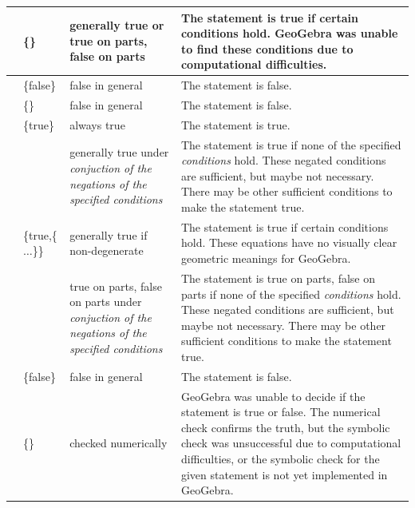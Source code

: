 \documentclass{article}
\begin{document}
\begin{tabular}{|>{\raggedright}m{}|>{\centering}m{}|>{\centering}m{}|>{\centering}m{}|}
\cline{2-4} 
 & {\footnotesize{}\{\}} & {\footnotesize{}generally true or true on parts, false on parts} & {\footnotesize{}The statement is true if certain conditions hold.
GeoGebra was unable to find these conditions due to computational
difficulties.}\tabularnewline
\hline 
\multirow{2}{0.15\textwidth}{\centerline{\footnotesize{}false}} & {\footnotesize{}\{false\}} & {\footnotesize{}false in general} & {\footnotesize{}The statement is false.}\tabularnewline
\cline{2-4} 
 & {\footnotesize{}\{\}} & {\footnotesize{}false in general} & {\footnotesize{}The statement is false.}\tabularnewline
\hline 
\multirow{5}{0.15\textwidth}{\centerline{\footnotesize{}undefined}} & {\footnotesize{}\{true\}} & {\footnotesize{}always true} & {\footnotesize{}The statement is true.}\tabularnewline
\cline{2-4} 
 & \multicolumn{1}{>{\centering}m{0.2\columnwidth}|}{{\footnotesize{}\{true,\{}\emph{\footnotesize{}conditions}{\footnotesize{}\}\}}} & {\footnotesize{}generally true under }\emph{\footnotesize{}conjuction of the negations of the specified
conditions} & {\footnotesize{}The statement is true if none of the specified }\emph{\footnotesize{}conditions}{\footnotesize{}
hold. These negated conditions are sufficient, but maybe not necessary. There
may be other sufficient conditions to make the statement true.}\tabularnewline
\cline{2-4} 
 & {\footnotesize{}\{true,\{$\ldots$\}\}} & {\footnotesize{}generally true if non-degenerate} & {\footnotesize{}The statement is true if certain conditions hold.
These equations have no visually clear geometric meanings for GeoGebra.}\tabularnewline
\cline{2-4} 
 & \multicolumn{1}{>{\centering}m{0.2\columnwidth}|}{{\footnotesize{}\{true,\{}\emph{\footnotesize{}conditions}{\footnotesize{}\},``c''\}}} & {\footnotesize{}true on parts, false on parts under }\emph{\footnotesize{}conjuction of the negations of the specified
conditions} & {\footnotesize{}The statement is true on parts, false on parts if none of the specified }\emph{\footnotesize{}conditions}{\footnotesize{}
hold. These negated conditions are sufficient, but maybe not necessary. There
may be other sufficient conditions to make the statement true.}\tabularnewline
\cline{2-4} 
 & {\footnotesize{}\{false\}} & {\footnotesize{}false in general} & {\footnotesize{}The statement is false.}\tabularnewline
\cline{2-4} 
 & {\footnotesize{}\{\}} & {\footnotesize{}checked numerically} & {\footnotesize{}GeoGebra was unable to decide if the statement is
true or false. The numerical check confirms the truth, but the symbolic
check was unsuccessful due to computational difficulties, or the symbolic
check for the given statement is not yet implemented in GeoGebra.}\tabularnewline
\hline 
\end{tabular}
\end{document}
